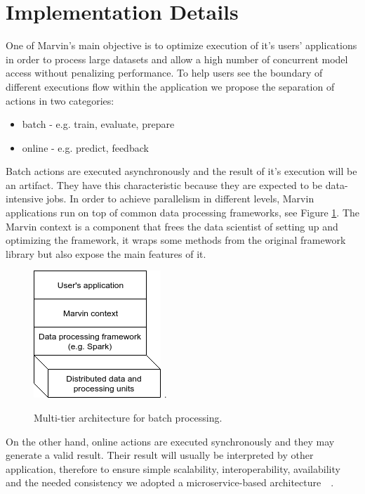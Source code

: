 \documentclass[twoside,11pt]{article}
\begin{document}
\section{Implementation Details}

One of Marvin's main objective is to optimize execution of it's users' applications in order to process large datasets and allow a high number of concurrent model access without penalizing performance. To help users see the boundary of different executions flow within the application we propose the separation of actions in two categories:
\begin{itemize}
    \item batch - e.g. train, evaluate, prepare
    \item online - e.g. predict, feedback
\end{itemize}

Batch actions are executed asynchronously and the result of it's execution will be an artifact. They have this characteristic because they are expected to be data-intensive jobs. In order to achieve parallelism in different levels, Marvin applications run on top of common data processing frameworks, see Figure \ref{fig_spark}. The Marvin context is a component that frees the data scientist of setting up and optimizing the framework, it wraps some methods from the original framework library but also expose the main features of it.
\begin{figure}[h]
\centering
\includegraphics[scale=0.7]{fig/marvin-spark.png}
\DeclareGraphicsExtensions.
\caption{Multi-tier architecture for batch processing.}
\label{fig_spark}
\end{figure}

On the other hand, online actions are executed synchronously and they may generate a valid result. Their result will usually be interpreted by other application, therefore to ensure simple scalability, interoperability, availability and the needed consistency we adopted a microservice-based architecture~\citep{brewer2000towards}~\citep{fowler2014microservices}. 
\end{document}
